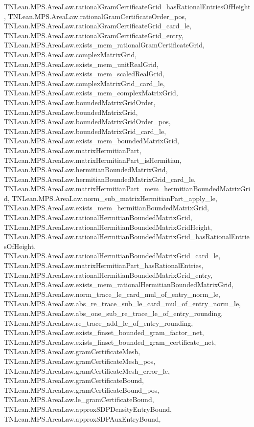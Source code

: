 \begin{lemma}
{        TNLean.MPS.AreaLaw.rationalGramCertificateGrid_hasRationalEntriesOfHeight,
        TNLean.MPS.AreaLaw.rationalGramCertificateOrder_pos,
        TNLean.MPS.AreaLaw.rationalGramCertificateGrid_card_le,
        TNLean.MPS.AreaLaw.rationalGramCertificateGrid_entry,
        TNLean.MPS.AreaLaw.exists_mem_rationalGramCertificateGrid,
        TNLean.MPS.AreaLaw.complexMatrixGrid,
        TNLean.MPS.AreaLaw.exists_mem_unitRealGrid,
        TNLean.MPS.AreaLaw.exists_mem_scaledRealGrid,
        TNLean.MPS.AreaLaw.complexMatrixGrid_card_le,
        TNLean.MPS.AreaLaw.exists_mem_complexMatrixGrid,
        TNLean.MPS.AreaLaw.boundedMatrixGridOrder,
        TNLean.MPS.AreaLaw.boundedMatrixGrid,
        TNLean.MPS.AreaLaw.boundedMatrixGridOrder_pos,
        TNLean.MPS.AreaLaw.boundedMatrixGrid_card_le,
        TNLean.MPS.AreaLaw.exists_mem_boundedMatrixGrid,
        TNLean.MPS.AreaLaw.matrixHermitianPart,
        TNLean.MPS.AreaLaw.matrixHermitianPart_isHermitian,
        TNLean.MPS.AreaLaw.hermitianBoundedMatrixGrid,
        TNLean.MPS.AreaLaw.hermitianBoundedMatrixGrid_card_le,
        TNLean.MPS.AreaLaw.matrixHermitianPart_mem_hermitianBoundedMatrixGrid,
        TNLean.MPS.AreaLaw.norm_sub_matrixHermitianPart_apply_le,
        TNLean.MPS.AreaLaw.exists_mem_hermitianBoundedMatrixGrid,
        TNLean.MPS.AreaLaw.rationalHermitianBoundedMatrixGrid,
        TNLean.MPS.AreaLaw.rationalHermitianBoundedMatrixGridHeight,
        TNLean.MPS.AreaLaw.rationalHermitianBoundedMatrixGrid_hasRationalEntriesOfHeight,
        TNLean.MPS.AreaLaw.rationalHermitianBoundedMatrixGrid_card_le,
        TNLean.MPS.AreaLaw.matrixHermitianPart_hasRationalEntries,
        TNLean.MPS.AreaLaw.rationalHermitianBoundedMatrixGrid_entry,
        TNLean.MPS.AreaLaw.exists_mem_rationalHermitianBoundedMatrixGrid,
        TNLean.MPS.AreaLaw.norm_trace_le_card_mul_of_entry_norm_le,
        TNLean.MPS.AreaLaw.abs_re_trace_sub_le_card_mul_of_entry_norm_le,
        TNLean.MPS.AreaLaw.abs_one_sub_re_trace_le_of_entry_rounding,
        TNLean.MPS.AreaLaw.re_trace_add_le_of_entry_rounding,
        TNLean.MPS.AreaLaw.exists_finset_bounded_gram_factor_net,
        TNLean.MPS.AreaLaw.exists_finset_bounded_gram_certificate_net,
        TNLean.MPS.AreaLaw.gramCertificateMesh,
        TNLean.MPS.AreaLaw.gramCertificateMesh_pos,
        TNLean.MPS.AreaLaw.gramCertificateMesh_error_le,
        TNLean.MPS.AreaLaw.gramCertificateBound,
        TNLean.MPS.AreaLaw.gramCertificateBound_pos,
        TNLean.MPS.AreaLaw.le_gramCertificateBound,
        TNLean.MPS.AreaLaw.approxSDPDensityEntryBound,
        TNLean.MPS.AreaLaw.approxSDPAuxEntryBound,
}
\end{lemma}
